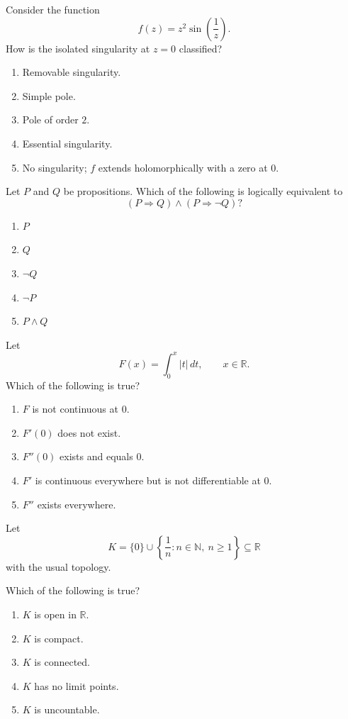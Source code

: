 \begin{exercise}
Consider the function
\[
f(z)=z^2\sin\left(\frac1z\right).
\]
How is the isolated singularity at
$z=0$ classified?
\begin{enumerate}[label=(\Alph*)]
\item Removable singularity.
\item Simple pole.
\item Pole of order $2$.
\item Essential singularity.
\item No singularity; $f$ extends
holomorphically with a zero at $0$.
\end{enumerate}
\end{exercise}

\begin{exercise}
Let $P$ and $Q$ be propositions.
Which of the following is logically
equivalent to
\[
(P\Rightarrow Q)\land
(P\Rightarrow\neg Q)?
\]
\begin{enumerate}[label=(\Alph*)]
\item $P$
\item $Q$
\item $\neg Q$
\item $\neg P$
\item $P\land Q$
\end{enumerate}
\end{exercise}

\begin{exercise}
Let
\[
F(x)=\int_0^x|t|\,dt,
\qquad x\in\mathbb R.
\]
Which of the following is true?
\begin{enumerate}[label=(\Alph*)]
\item $F$ is not continuous at $0$.
\item $F'(0)$ does not exist.
\item $F''(0)$ exists and equals $0$.
\item $F'$ is continuous everywhere
but is not differentiable at $0$.
\item $F''$ exists everywhere.
\end{enumerate}
\end{exercise}

\begin{exercise}
Let
\[
K=\{0\}\cup
\left\{\frac1n:n\in\mathbb N,\ n\geq1\right\}
\subseteq\mathbb R
\]
with the usual topology.

Which of the following is true?
\begin{enumerate}[label=(\Alph*)]
\item $K$ is open in $\mathbb R$.
\item $K$ is compact.
\item $K$ is connected.
\item $K$ has no limit points.
\item $K$ is uncountable.
\end{enumerate}
\end{exercise}

